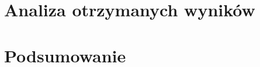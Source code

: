 \documentclass{wfiisul}
\begin{document}

\chapter{Analiza otrzymanych wyników}




\chapter{Podsumowanie}

\listoftables
\listoffigures

\end{document}
